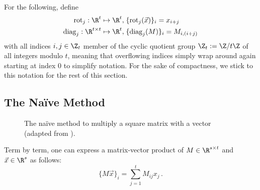 For the following, define
\newcommand{\rot}{\mathrm{rot}}
\newcommand{\diag}{\mathrm{diag}}
\begin{align}
  \rot_j: \R^t \mapsto \R^t,             & \; \{\rot_j(\vec{x})\}_i = x_{i + j} \label{eq:rot-definition} \\
  \diag_j: \R^{t \times t} \mapsto \R^t, & \; \{\diag_j(M)\}_i = M_{i, (i+j)} \label{eq:diag-definition}
\end{align}
with all indices $i, j \in \Z_t$ member of the cyclic quotient group $\Z_t := \Z / t \Z$ of all integers modulo $t$, meaning that overflowing indices simply wrap around again starting at index $0$ to simplify notation.
For the sake of compactness, we stick to this notation for the rest of this section.

\pagebreak
\subsection{The Naïve Method}
\begin{figure}[H]
  \centering
  \caption[Naïve matrix multiplication method]{The naïve method to multiply a square matrix with a vector (adapted from \cite{2018-gazelle}).}
\end{figure}

Term by term, one can express a matrix-vector product of $M \in \R^{s \times t}$ and
$\vec{x} \in \R^s$ as follows:
$$\{M \vec{x}\}_i = \sum_{j=1}^{t} M_{ij} x_j \,.$$

